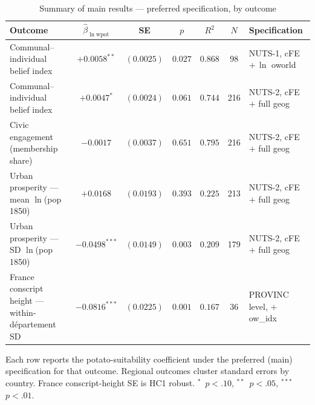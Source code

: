 

\begin{table}[!htbp]\centering
\caption{Summary of main results --- preferred specification, by outcome}
\label{tab:summary}
\small
\begin{threeparttable}
\begin{tabular}{lcccccl}
\toprule
Outcome & $\hat\beta_{\ln\mathrm{wpot}}$ & SE & $p$ & $R^2$ & $N$ & Specification \\
\midrule
Communal--individual belief index           & $+0.0058^{**}$  & $(0.0025)$ & $0.027$ & $0.868$ & 98     & NUTS-1, cFE $+\,\ln$ oworld \\
Communal--individual belief index           & $+0.0047^{*}$   & $(0.0024)$ & $0.061$ & $0.744$ & 216    & NUTS-2, cFE $+$ full geog \\
Civic engagement (membership share)         & $-0.0017$       & $(0.0037)$ & $0.651$ & $0.795$ & 216    & NUTS-2, cFE $+$ full geog \\
Urban prosperity --- mean $\ln$(pop 1850)   & $+0.0168$       & $(0.0193)$ & $0.393$ & $0.225$ & 213    & NUTS-2, cFE $+$ full geog \\
Urban prosperity --- SD $\ln$(pop 1850)     & $-0.0498^{***}$ & $(0.0149)$ & $0.003$ & $0.209$ & 179    & NUTS-2, cFE $+$ full geog \\
France conscript height --- within-département SD & $-0.0816^{***}$ & $(0.0225)$ & $0.001$ & $0.167$ & 36     & PROVINC level, $+$ ow\_idx \\
\bottomrule
\end{tabular}
\begin{tablenotes}\footnotesize
\item Each row reports the potato-suitability coefficient under the preferred (main) specification for that outcome. Regional outcomes cluster standard errors by country. France conscript-height SE is HC1 robust. $^{*}$~$p<.10$, $^{**}$~$p<.05$, $^{***}$~$p<.01$.
\end{tablenotes}
\end{threeparttable}
\end{table}

